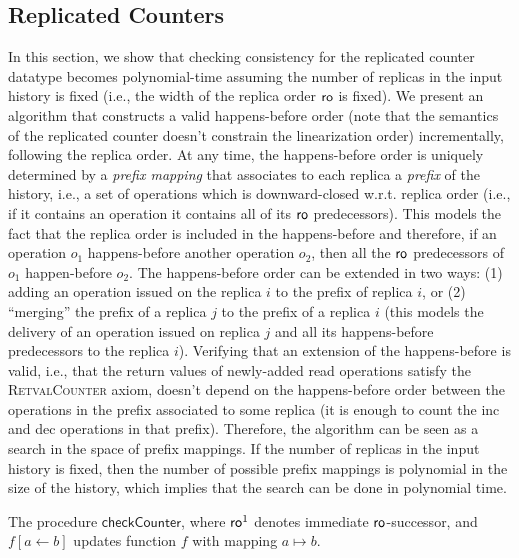 \subsection{Replicated Counters}
\label{sec:counter}

In this section, we show that checking consistency for the replicated counter datatype becomes polynomial-time assuming the number of replicas in the input history is fixed (i.e., the width of the replica order $\mathsf{ro}$ is fixed). We present an algorithm that constructs a valid happens-before order (note that the semantics of the replicated counter doesn't constrain the linearization order) incrementally, following the replica order. At any time, the happens-before order is uniquely determined by a \emph{prefix mapping} that associates to each replica a \emph{prefix} of the history, i.e., a set of operations which is downward-closed w.r.t. replica order (i.e., if it contains an operation it contains all of its $\mathsf{ro}$ predecessors). This models the fact that the replica order is included in the happens-before and therefore, if an operation $o_1$ happens-before another operation $o_2$, then all the $\mathsf{ro}$ predecessors of $o_1$ happen-before $o_2$. The happens-before order can be extended in two ways: (1) adding an operation issued on the replica $i$ to the prefix of replica $i$, or (2) ``merging'' the prefix of a replica $j$ to the prefix of a replica $i$ (this models the delivery of an operation issued on replica $j$ and all its happens-before predecessors to the replica $i$). Verifying that an extension of the happens-before is valid, i.e., that the return values of newly-added {\sf read} operations satisfy the \textsc{RetvalCounter} axiom, doesn't depend on the happens-before order between the operations in the prefix associated to some replica (it is enough to count the {\sf inc} and {\sf dec} operations in that prefix). Therefore, the algorithm can be seen as a search in the space of prefix mappings. If the number of replicas in the input history is fixed, then the number of possible prefix mappings is polynomial in the size of the history, which implies that the search can be done in polynomial time.

\begin{algorithm}[t]
  {\footnotesize}
  \caption{The procedure $\mathsf{checkCounter}$, where $\mathsf{ro}^1$ denotes immediate $\mathsf{ro}$-successor, and $f[a\leftarrow b]$ updates function $f$ with mapping $a \mapsto b$.}
  \label{countercrdtalgo:main}
\end{algorithm}


